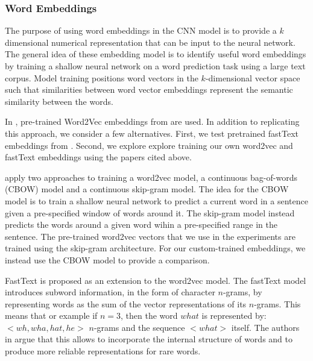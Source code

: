 \documentclass[conference]{IEEEtran}
\begin{document}
\subsubsection{Word Embeddings}
The purpose of using word embeddings in the CNN model is to provide a $k$ dimensional numerical representation that can be input to the neural network. The general idea of these embedding model is to identify useful word embeddings by training a shallow neural network on a word prediction task using a large text corpus. Model training positions word vectors in the $k$-dimensional vector space such that similarities between word vector embeddings represent the semantic similarity between the words.

In \cite{kim-2014-convolutional}, pre-trained Word2Vec embeddings from \cite{mikolov2013distributed, mikolov2013efficient} are used. In addition to replicating this approach, we consider a few alternatives. First, we test pretrained fastText embeddings from \cite{bojanowski2016enriching, joulin2016bag}. Second, we explore explore training our own word2vec and fastText embeddings using the papers cited above.

 \cite{mikolov2013efficient} apply two approaches to training a word2vec model, a continuous bag-of-words (CBOW) model and a continuous skip-gram model. The idea for the CBOW model  is to train a shallow neural network to predict a current word in a sentence given a pre-specified window of words around it. The skip-gram model instead predicts the words around a given word wihin a pre-specified range in the sentence. The pre-trained word2vec vectors that we use in the experiments are trained using the skip-gram architecture. For our custom-trained embeddings, we instead use the CBOW model to provide a comparison.

FastText \cite{bojanowski2016enriching} is proposed as an extension to the word2vec model. The fastText model introduces subword information, in the form of character $n$-grams, by representing words as the sum of the vector representations of its $n$-grams. This means that or example if $n = 3$, then the word $what$ is represented by: $<wh, wha, hat, he>$ $n$-grams and the sequence $<what>$ itself. The authors in \cite{bojanowski2016enriching} argue that this allows to incorporate the internal structure of words and to produce more reliable representations for rare words.
\end{document}
